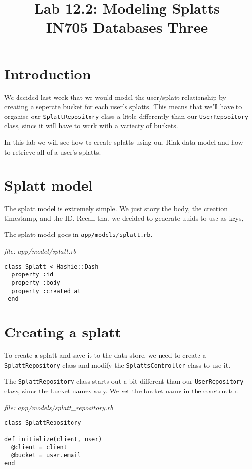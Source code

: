 \documentclass{article}
\begin{document}
\title{Lab 12.2: Modeling Splatts\\ IN705 Databases Three}
\date{}
\maketitle

\section*{Introduction}
We decided last week that we would model the user/splatt relationship by creating a seperate bucket for each user's splatts.  This means that we'll have to organise our \texttt{SplattRepository} class a little differently than our \texttt{UserRepsoitory} class, since it will have to work with a variecty of buckets.  

In this lab we will see how to create splatts using our Riak data model and how to retrieve all of a user's splatts.

\section{Splatt model}
The splatt model is extremely simple.  We just story the body, the creation timestamp, and the ID.  Recall that we decided to generate uuids to use as keys,

The splatt model goes in \texttt{app/models/splatt.rb}.

\emph{file: app/model/splatt.rb}

\begin{verbatim}
class Splatt < Hashie::Dash
  property :id
  property :body
  property :created_at
 end
 \end{verbatim}

\section{Creating a splatt}
To create a splatt and save it to the data store, we need to create a \texttt{SplattRepository} class and modify the \texttt{SplattsController} class to use it.

The \texttt{SplattRepository} class starts out a bit different than our \texttt{UserRepository} class, since the bucket names vary. We set the bucket name in the constructor.

\emph{file:  app/models/splatt\_repository.rb}
\begin{verbatim}
class SplattRepository

def initialize(client, user)
  @client = client
  @bucket = user.email
end
\end{verbatim}
\end{document}
